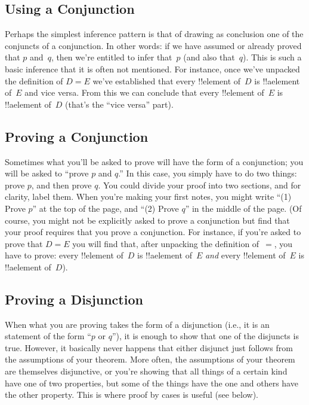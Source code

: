 \documentclass[../../../include/open-logic-section]{subfiles}
\begin{document}
\subsection{Using a Conjunction}

Perhaps the simplest inference pattern is that of drawing as
conclusion one of the conjuncts of a conjunction. In other words: if
we have assumed or already proved that $p$ and~$q$, then we're
entitled to infer that~$p$ (and also that~$q$).  This is such a basic
inference that it is often not mentioned.  For instance, once we've
unpacked the definition of $D = E$ we've established that every
!!{element} of~$D$ is !!a{element} of~$E$ and vice versa. From this
we can conclude that every !!{element} of~$E$ is !!a{element} of~$D$
(that's the ``vice versa'' part).  

\subsection{Proving a Conjunction}

Sometimes what you'll be asked to prove will have the form of a
conjunction; you will be asked to ``prove $p$ and $q$.'' In this case,
you simply have to do two things: prove $p$, and then prove $q$. You
could divide your proof into two sections, and for clarity, label
them. When you're making your first notes, you might write ``(1) Prove
$p$'' at the top of the page, and ``(2) Prove $q$'' in the middle of
the page. (Of course, you might not be explicitly asked to prove a
conjunction but find that your proof requires that you prove a
conjunction. For instance, if you're asked to prove that $D = E$ you
will find that, after unpacking the definition of~$=$, you have to
prove: every !!{element} of~$D$ is !!a{element} of~$E$
\emph{and} every !!{element} of~$E$ is !!a{element} of~$D$).

\subsection{Proving a Disjunction}

When what you are proving takes the form of a disjunction (i.e., it is
an statement of the form ``$p$ or $q$''), it is enough to show that
one of the disjuncts is true.  However, it basically never happens
that either disjunct just follows from the assumptions of your
theorem. More often, the assumptions of your theorem are themselves
disjunctive, or you're showing that all things of a certain kind have
one of two properties, but some of the things have the one and others
have the other property.  This is where proof by cases is
useful (see below).
\end{document}
